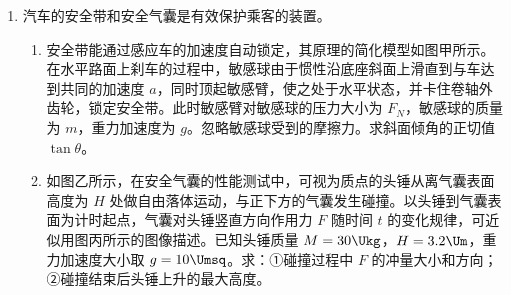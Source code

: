 \documentclass[\gkver]{gaokaozhenti}
\begin{document}
\begin{enumerate}
{（编者注：公开版本的初始体积指数有异文。若题面为 $V_{A1}=4.0\times10^{-2}\Umc$，本问相应为 $3.6\times10^{-2}\Umc$。两种版本的体积比例相同。）

由于 $p_{0}-p_{B2}<\Delta p$

假设成立，即 $p_{B2}=9 \times 10^{4} \UPa$

（3）恰好稳定时，A 内气体压强为 $p_{A}'=p_{0}+\frac{mg}{S}$

B 内气体压强 $p_{B}'=p_{0}$

此时差压阀恰好关闭，所以有 $p_{A}'-p_{B}'=\Delta p$

代入数据联立解得 $m = 1.1 \times 10^{2} \Ukg$。
}

\item
汽车的安全带和安全气囊是有效保护乘客的装置。
\begin{enumerate}
	\item
	安全带能通过感应车的加速度自动锁定，其原理的简化模型如图甲所示。在水平路面上刹车的过程中，敏感球由于惯性沿底座斜面上滑直到与车达到共同的加速度 $a$，同时顶起敏感臂，使之处于水平状态，并卡住卷轴外齿轮，锁定安全带。此时敏感臂对敏感球的压力大小为 $F_{N}$，敏感球的质量为 $m$，重力加速度为 $g$。忽略敏感球受到的摩擦力。求斜面倾角的正切值 $\tan\theta$。
	\item
	如图乙所示，在安全气囊的性能测试中，可视为质点的头锤从离气囊表面高度为 $H$ 处做自由落体运动，与正下方的气囊发生碰撞。以头锤到气囊表面为计时起点，气囊对头锤竖直方向作用力 $F$ 随时间 $t$ 的变化规律，可近似用图丙所示的图像描述。已知头锤质量 $M = 30 \Ukg$，$H = 3.2 \Um$，重力加速度大小取 $g = 10 \Umsq$。求：①碰撞过程中 $F$ 的冲量大小和方向；②碰撞结束后头锤上升的最大高度。
\end{enumerate}

\end{enumerate}
\end{document}
